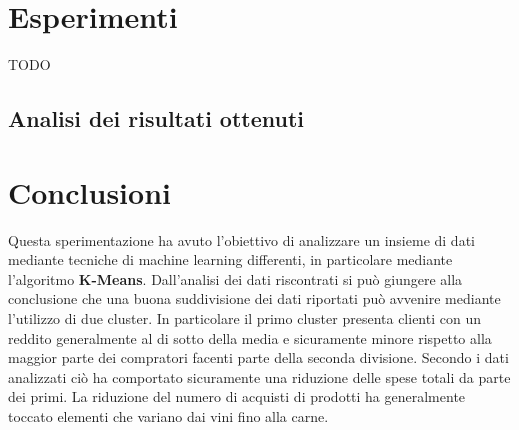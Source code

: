 \documentclass[letterpaper,11pt]{article}
\begin{document}
\section{Esperimenti}
TODO

\subsection{Analisi dei risultati ottenuti}

\newpage
\section*{Conclusioni}

Questa sperimentazione ha avuto l'obiettivo di analizzare un insieme di dati mediante tecniche di machine learning differenti, in particolare mediante l'algoritmo \textbf{K-Means}. Dall'analisi dei dati riscontrati si può giungere alla conclusione che una buona suddivisione dei dati riportati può avvenire mediante l'utilizzo di due cluster. In particolare il primo cluster presenta clienti con un reddito generalmente al di sotto della media e sicuramente minore rispetto alla maggior parte dei compratori facenti parte della seconda divisione. Secondo i dati analizzati ciò ha comportato sicuramente una riduzione delle spese totali da parte dei primi. La riduzione del numero di acquisti di prodotti ha generalmente toccato elementi che variano dai vini fino alla carne.
\end{document}
